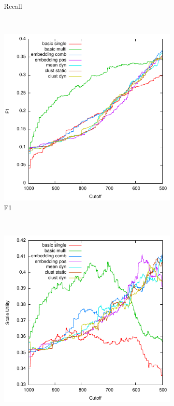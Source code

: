 \documentclass{sig-alternate}
\begin{document}
{{\begin{figure}[tb]
\begin{subfigure}[b]{\officialRunWidth}
			\caption{Recall}
			\label{official:recall}
    \end{subfigure}
    ~
    \begin{subfigure}[b]{\officialRunWidth}
            \includegraphics[width=\textwidth]{fig/official/official-f1}
			\caption{F1}
			\label{official:f1}
    \end{subfigure}
    ~
    \begin{subfigure}[b]{\officialRunWidth}
            \includegraphics[width=\textwidth]{fig/official/official-su}

\end{subfigure}
\end{figure}}}
\end{document}
